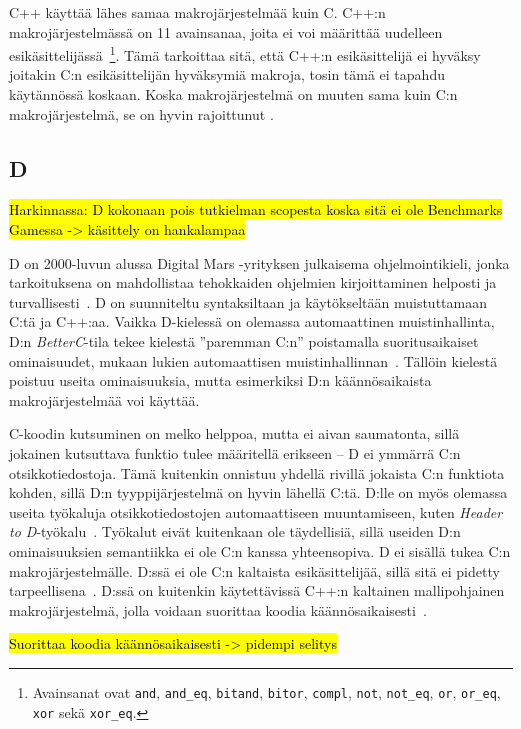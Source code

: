 C++ käyttää lähes samaa makrojärjestelmää kuin C. C++:n makrojärjestelmässä on
11 avainsanaa, joita ei voi määrittää uudelleen
esikäsittelijässä~\citep[luku~19.2]{CPP17}\footnote{ Avainsanat ovat
\texttt{and}, \texttt{and\_eq}, \texttt{bitand}, \texttt{bitor},
\texttt{compl}, \texttt{not}, \texttt{not\_eq}, \texttt{or}, \texttt{or\_eq},
\texttt{xor} sekä \texttt{xor\_eq}. }. Tämä tarkoittaa sitä, että C++:n
esikäsittelijä ei hyväksy joitakin C:n esikäsittelijän hyväksymiä makroja,
tosin tämä ei tapahdu käytännössä koskaan. Koska makrojärjestelmä on muuten
sama kuin C:n makrojärjestelmä, se on hyvin rajoittunut \citep[luku~19]{CPP17}.

\subsection{D}

\hl{Harkinnassa: D kokonaan pois tutkielman scopesta koska sitä ei ole
Benchmarks Gamessa -> käsittely on hankalampaa}

D on 2000-luvun alussa Digital Mars -yrityksen julkaisema ohjelmointikieli,
jonka tarkoituksena on mahdollistaa tehokkaiden ohjelmien kirjoittaminen
helposti ja turvallisesti~\citep{dhistory}. D on suunniteltu syntaksiltaan ja
käytökseltään muistuttamaan C:tä ja C++:aa. Vaikka D-kielessä on olemassa
automaattinen muistinhallinta, D:n \emph{BetterC}-tila tekee kielestä
''paremman C:n'' poistamalla suoritusaikaiset ominaisuudet, mukaan lukien
automaattisen muistinhallinnan~\citep{dbetterc}. Tällöin kielestä poistuu
useita ominaisuuksia, mutta esimerkiksi D:n käännösaikaista makrojärjestelmää
voi käyttää.

C-koodin kutsuminen on melko helppoa, mutta ei aivan saumatonta, sillä jokainen
kutsuttava funktio tulee määritellä erikseen -- D ei ymmärrä C:n
otsikkotiedostoja. Tämä kuitenkin onnistuu yhdellä rivillä jokaista C:n
funktiota kohden, sillä D:n tyyppijärjestelmä on hyvin lähellä C:tä. D:lle on
myös olemassa useita työkaluja otsikkotiedostojen automaattiseen muuntamiseen,
kuten \emph{Header to D}-työkalu~\citep{htod}. Työkalut eivät kuitenkaan ole
täydellisiä, sillä useiden D:n ominaisuuksien semantiikka ei ole C:n kanssa
yhteensopiva. D ei sisällä tukea C:n makrojärjestelmälle. D:ssä ei ole C:n
kaltaista esikäsittelijää, sillä sitä ei pidetty tarpeellisena~\citep{pretod}.
D:ssä on kuitenkin käytettävissä C++:n kaltainen mallipohjainen
makrojärjestelmä, jolla voidaan suorittaa koodia
käännösaikaisesti~\citep{Dtemplate}.

\hl{Suorittaa koodia käännösaikaisesti -> pidempi selitys}


